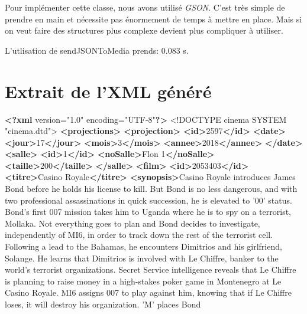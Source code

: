 \documentclass[]{article}
\newenvironment{Shaded}{}{}
\newcommand{\KeywordTok}[1]{\textcolor[rgb]{0.00,0.44,0.13}{\textbf{{#1}}}}
\newcommand{\DataTypeTok}[1]{\textcolor[rgb]{0.56,0.13,0.00}{{#1}}}
\newcommand{\NormalTok}[1]{{#1}}
\begin{document}
Pour implémenter cette classe, nous avons utilisé \emph{GSON}. C'est
très simple de prendre en main et nécessite pas énormement de temps à
mettre en place. Mais si on veut faire des structures plus complexe
devient plus compliquer à utiliser.

L'utlisation de sendJSONToMedia prends: 0.083 s.

\section{Extrait de l'XML généré}\label{header-n151}

\begin{Shaded}
\begin{Highlighting}[]
\KeywordTok{<?xml} \NormalTok{version="1.0" encoding="UTF-8"}\KeywordTok{?>}
\DataTypeTok{<!DOCTYPE }\NormalTok{cinema SYSTEM "cinema.dtd"}\DataTypeTok{>}
\KeywordTok{<projections>}
  \KeywordTok{<projection>}
    \KeywordTok{<id>}\NormalTok{2597}\KeywordTok{</id>}
    \KeywordTok{<date>}
      \KeywordTok{<jour>}\NormalTok{17}\KeywordTok{</jour>}
      \KeywordTok{<mois>}\NormalTok{3}\KeywordTok{</mois>}
      \KeywordTok{<annee>}\NormalTok{2018}\KeywordTok{</annee>}
    \KeywordTok{</date>}
    \KeywordTok{<salle>}
      \KeywordTok{<id>}\NormalTok{1}\KeywordTok{</id>}
      \KeywordTok{<noSalle>}\NormalTok{Flon 1}\KeywordTok{</noSalle>}
      \KeywordTok{<taille>}\NormalTok{200}\KeywordTok{</taille>}
    \KeywordTok{</salle>}
    \KeywordTok{<film>}
      \KeywordTok{<id>}\NormalTok{2053403}\KeywordTok{</id>}
      \KeywordTok{<titre>}\NormalTok{Casino Royale}\KeywordTok{</titre>}
      \KeywordTok{<synopsis>}\NormalTok{Casino Royale introduces James Bond before he holds his license to kill.}
      {But Bond is no less dangerous, and with two professional assassinations in quick succession,}
      {he is elevated to '00' status. Bond's first 007 mission takes him to Uganda where he is to}
      {spy on a terrorist, Mollaka. Not everything goes to plan and Bond decides to investigate,}
      {independently of MI6, in order to track down the rest of the terrorist cell. Following a}
      {lead to the Bahamas, he encounters Dimitrios and his girlfriend, Solange. He learns that}
      {Dimitrios is involved with Le Chiffre, banker to the world's terrorist organizations.}
      {Secret Service intelligence reveals that Le Chiffre is planning to raise money in a}
      {high-stakes poker game in Montenegro at Le Casino Royale. MI6 assigns 007 to play against}
      {him, knowing that if Le Chiffre loses, it will destroy his organization. 'M' places Bond}

\end{Highlighting}
\end{Shaded}
\end{document}
